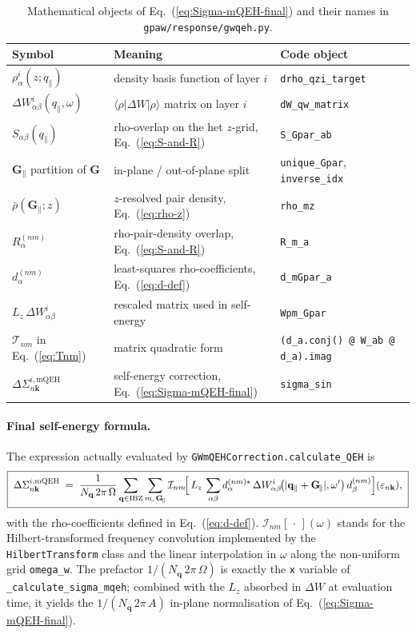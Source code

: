 \documentclass[11pt,a4paper]{article}
\newcommand{\qq}{\mathbf{q}}
\newcommand{\GG}{\mathbf{G}}
\newcommand{\kk}{\mathbf{k}}
\newcommand{\Gpar}{\mathbf{G}_{\!\parallel}}
\newcommand{\qpar}{\mathbf{q}_{\parallel}}
\newcommand{\eps}{\varepsilon}
\newcommand{\eq}[1]{Eq.~(\ref{eq:#1})}
\begin{document}
\begin{table}[h]
\centering
\small
\begin{tabular}{l l l}
\hline
Symbol & Meaning & Code object \\
\hline
$\rho^{i}_{\alpha}(z;q_\parallel)$ & density basis function of layer
$i$ & \texttt{drho\_qzi\_target}\\
$\Delta W^{i}_{\alpha\beta}(q_\parallel,\omega)$ &
$\langle\rho|\Delta W|\rho\rangle$ matrix on layer $i$
& \texttt{dW\_qw\_matrix}\\
$S_{\alpha\beta}(q_\parallel)$ & rho-overlap on the het $z$-grid,
\eq{S-and-R} & \texttt{S\_Gpar\_ab}\\
$\Gpar$ partition of $\GG$ & in-plane / out-of-plane split &
\texttt{unique\_Gpar}, \texttt{inverse\_idx}\\
$\bar\rho(\Gpar;z)$ & $z$-resolved pair density, \eq{rho-z} &
\texttt{rho\_mz}\\
$R^{(nm)}_{\alpha}$ & rho-pair-density overlap, \eq{S-and-R} &
\texttt{R\_m\_a}\\
$d^{(nm)}_{\alpha}$ & least-squares rho-coefficients, \eq{d-def} &
\texttt{d\_mGpar\_a}\\
$L_z\,\Delta W^{i}_{\alpha\beta}$ & rescaled matrix used in
self-energy & \texttt{Wpm\_Gpar}\\
$\mathcal{T}_{nm}$ in \eq{Tnm} & matrix quadratic form &
\texttt{(d\_a.conj() @ W\_ab @ d\_a).imag}\\
$\Delta\Sigma^{i,\text{mQEH}}_{n\kk}$ & self-energy correction,
\eq{Sigma-mQEH-final} & \texttt{sigma\_sin}\\
\hline
\end{tabular}
\caption{Mathematical objects of \eq{Sigma-mQEH-final} and their
names in \texttt{gpaw/response/gwqeh.py}.}
\label{tab:summary}
\end{table}

\paragraph{Final self-energy formula.}  The expression actually
evaluated by \texttt{GWmQEHCorrection.calculate\_QEH} is
\begin{equation}
\boxed{\;
\Delta\Sigma^{i,\text{mQEH}}_{n\kk}\;=\;
\frac{1}{N_{\mathbf{q}}\,2\pi\,\Omega}
\sum_{\qq\in\text{IBZ}}\sum_{m,\,\Gpar}
\mathcal{I}_{nm}\!\Bigl[\,
L_z\,
\sum_{\alpha\beta}
d^{(nm)*}_{\alpha}\,
\Delta W^{i}_{\alpha\beta}\!\bigl(|\qpar+\Gpar|,\omega'\bigr)\,
d^{(nm)}_{\beta}
\Bigr](\eps_{n\kk}),
\;}
\label{eq:Sigma-code}
\end{equation}
with the rho-coefficients defined in \eq{d-def}.
$\mathcal{I}_{nm}[\,\cdot\,](\omega)$ stands for the
Hilbert-transformed frequency convolution implemented by the
\texttt{HilbertTransform} class and the linear interpolation in
$\omega$ along the non-uniform grid \texttt{omega\_w}.  The prefactor
$1/(N_{\mathbf{q}}\,2\pi\,\Omega)$ is exactly the \texttt{x} variable
of \texttt{\_calculate\_sigma\_mqeh}; combined with the $L_z$
absorbed in $\Delta W$ at evaluation time, it yields the
$1/(N_{\mathbf{q}}\,2\pi\,A)$ in-plane normalisation of
\eq{Sigma-mQEH-final}.
\end{document}
